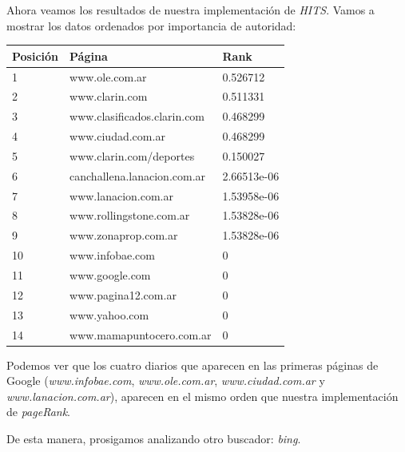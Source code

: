 Ahora veamos los resultados de nuestra implementación de \textit{HITS}. Vamos a mostrar los datos ordenados por importancia de autoridad:

\begin{center}
    \begin{tabular}{| l | l | l |}
    \hline
    Posición & Página & Rank  \\ \hline
    
	1 & www.ole.com.ar & 0.526712 \\ \hline
	2 & www.clarin.com & 0.511331 \\ \hline
	3 & www.clasificados.clarin.com & 0.468299 \\ \hline
	4 & www.ciudad.com.ar & 0.468299 \\ \hline
	5 & www.clarin.com/deportes & 0.150027	 \\ \hline
	6 & canchallena.lanacion.com.ar & 2.66513e-06 \\ \hline
	7 & www.lanacion.com.ar  & 1.53958e-06 \\ \hline
	8 & www.rollingstone.com.ar & 1.53828e-06 \\ \hline
	9 & www.zonaprop.com.ar & 1.53828e-06 \\ \hline
	10 & www.infobae.com & 0 \\ \hline
	11 & www.google.com & 0  \\ \hline
	12 & www.pagina12.com.ar & 0	\\ \hline		
	13 & www.yahoo.com & 0 \\ \hline
	14 & www.mamapuntocero.com.ar & 0 \\ \hline   
    \end{tabular}
\end{center}

Podemos ver que los cuatro diarios que aparecen en las primeras páginas de Google (\textit{www.infobae.com}, \textit{www.ole.com.ar}, \textit{www.ciudad.com.ar} y \textit{www.lanacion.com.ar}), aparecen en el mismo orden que nuestra implementación de \textit{pageRank}.
\par 
De esta manera, prosigamos analizando otro buscador: \textit{bing}.

